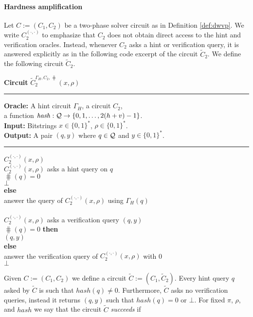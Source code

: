 \paragraph{Hardness amplification}%
Let $C := (C_1, C_2)$ be a two-phase solver circuit as in Definition \ref{def:dwvp}.
We write $C_2^{(\cdot, \cdot)}$ to emphasize that $C_2$ does not obtain direct access to the hint and verification oracles.
Instead, whenever $C_2$ asks a hint or verification query, it is answered explicitly
as in the following code excerpt of the circuit $\widetilde{C}_2$.
We define the following circuit $\widetilde{C}_2$.
\begin{codeblock}
  \textbf{Circuit} $\widetilde{C}_2^{\Gamma_H, C_2, \hash} (x, \rho)$
  \medskip \hrule
  \textbf{Oracle:} A hint circuit $\Gamma_H$, a circuit $C_2$, \\ \IndII a function $\operatorname{\mathit{hash}} : \mathcal{Q} \rightarrow \{0,1,\dots, 2(h+v)-1\}$. \\
  \textbf{Input:} Bitstrings $x \in \{0,1\}^{*}$, $\rho \in \{0,1\}^{*}$. \\
  \textbf{Output:} A pair $(q, y)$ where $q \in \mathcal{Q}$ and $y \in \{0,1\}^{*}$.
  \medskip\hrule
  \Run $C_2^{(\cdot, \cdot)}(x, \rho)$ \\
  \IndI \If $C_2^{(\cdot, \cdot)}(x, \rho)$ asks a hint query on $q$ \Then\\
  \IndII \If $\hash(q) = 0$ \Then\\
  \IndIII \Return $\bot$\\
  \IndII \textbf{else}\\
  \IndIII answer the query of $C_2^{(\cdot, \cdot)}(x, \rho)$ using $\Gamma_H(q)$\\
  \\
  \IndI \If $C_2^{(\cdot, \cdot)}(x, \rho)$ asks a verification query $(q, y)$ \Then \\
  \IndII \If $\hash(q) = 0 $ \textbf{then} \\
  \IndIII \Return $(q, y)$ \\
  \IndII \textbf{else} \\
  \IndIII answer the verification query of $C_2^{(\cdot, \cdot)}(x, \rho)$ with 0 \\
  \Return $\bot$
\end{codeblock}
%
Given $C := (C_1, C_2)$ we define a circuit $\widetilde{C} := (C_1, \widetilde{C}_2)$.
Every hint query $q$ asked by $\widetilde{C}$ is such that $hash(q) \neq 0$. Furthermore, $\widetilde{C}$ asks no verification queries,
instead it returns $(q,y)$ such that $hash(q) = 0$ or $\bot$.
For fixed $\pi$, $\rho$, and $hash$ we say that the circuit $\widetilde{C}$ \textit{succeeds} if
